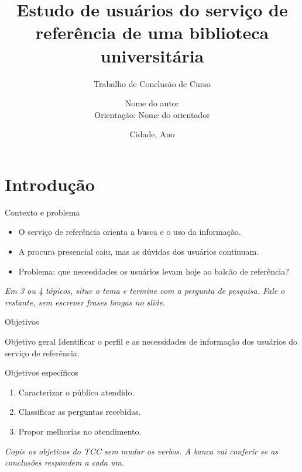 \newif\ifinstrucoes
\instrucoestrue
\newcommand{\instrucao}[1]{\ifinstrucoes\par\vfill{\color{gray}\scriptsize\itshape #1\par}\fi}

\title[Defesa de TCC]{Estudo de usuários do serviço de referência de uma biblioteca universitária}
\subtitle{Trabalho de Conclusão de Curso}
\author[Nome do autor]{Nome do autor\\[2pt]{\small Orientação: Nome do orientador}}
\date[Ano]{Cidade, Ano}



\begin{frame}[plain]
  \titlepage
\end{frame}

\section{Introdução}
\begin{frame}{Contexto e problema}
  \begin{itemize}
    \item O serviço de referência orienta a busca e o uso da informação.
    \item A procura presencial caiu, mas as dúvidas dos usuários continuam.
    \item \alert{Problema:} que necessidades os usuários levam hoje ao balcão de referência?
  \end{itemize}
  \instrucao{Em 3 ou 4 tópicos, situe o tema e termine com a pergunta de pesquisa. Fale o restante, sem escrever frases longas no slide.}
\end{frame}

\begin{frame}{Objetivos}
  \begin{block}{Objetivo geral}
    Identificar o perfil e as necessidades de informação dos usuários do serviço de referência.
  \end{block}
  \begin{block}{Objetivos específicos}
    \begin{enumerate}
      \item Caracterizar o público atendido.
      \item Classificar as perguntas recebidas.
      \item Propor melhorias no atendimento.
    \end{enumerate}
  \end{block}
  \instrucao{Copie os objetivos do TCC sem mudar os verbos. A banca vai conferir se as conclusões respondem a cada um.}
\end{frame}


